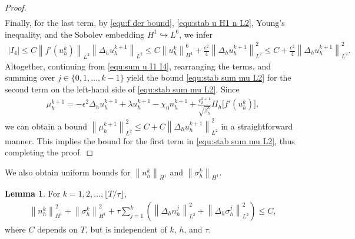 \documentclass[11pt, reqno]{amsart}
\theoremstyle{definition}
\newtheorem{lemma}[theorem]{Lemma}
\numberwithin{equation}{section}
\newcommand{\norm}[2]{\left\|{#1}\right\|_{#2}}
\newcommand{\abs}[1]{\left|{#1}\right|}
\begin{document}
\begin{proof}
\begin{align*}
\end{align*}
Finally, for the last term, by \eqref{equ:f der bound}, \eqref{equ:stab u H1 n L2}, Young's inequality, and the Sobolev embedding $H^1\hookrightarrow L^6$, we infer
\begin{align*}
	\abs{I_4}
	\leq
	C\norm{f'(u_h^k)}{L^2} \norm{{\Delta_h u_h^{k+1}}}{L^2}
	\leq
	C\norm{u_h^k}{H^1}^6 + \frac{\epsilon^2}{4} \norm{\Delta_h u_h^{k+1}}{L^2}^2
	\leq
	C+ \frac{\epsilon^2}{4} \norm{\Delta_h u_h^{k+1}}{L^2}^2.
\end{align*}
Altogether, continuing from \eqref{equ:sum u I1 I4}, rearranging the terms, and summing over $j\in \{0,1,\ldots, k-1\}$ yield the bound \eqref{equ:stab sum mu L2} for the second term on the left-hand side of \eqref{equ:stab sum mu L2}. Since
\begin{align*}
	\mu_h^{k+1}= -\epsilon^2 \Delta_h u_h^{k+1}+ \lambda u_h^{k+1} - \chi_0 n_h^{k+1} +  \frac{r_h^{k+1}}{\sqrt{\beta_h^k}} \Pi_h \big[f'(u_h^k)\big],
\end{align*}
we can obtain a bound $\norm{\mu_h^{k+1}}{L^2}^2\leq C+ C\norm{\Delta_h u_h^{k+1}}{L^2}^2$ in a straightforward manner. This implies the bound for the first term in \eqref{equ:stab sum mu L2}, thus completing the proof.
\end{proof}

We also obtain uniform bounds for $\norm{n_h^k}{H^1}$ and $\norm{\sigma_h^k}{H^1}$.

\begin{lemma}
For $k=1,2,\ldots, \lfloor T/\tau \rfloor$,
\begin{align}\label{equ:stab n H1}
	\norm{n_h^k}{H^1}^2 + \norm{\sigma_h^k}{H^1}^2 + \tau \sum_{j=1}^k \left(\norm{\Delta_h n_h^j}{L^2}^2 + \norm{\Delta_h \sigma_h^j}{L^2}^2 \right)
	\leq C,
\end{align}
where $C$ depends on $T$, but is independent of $k$, $h$, and $\tau$.
\end{lemma}
\end{document}
